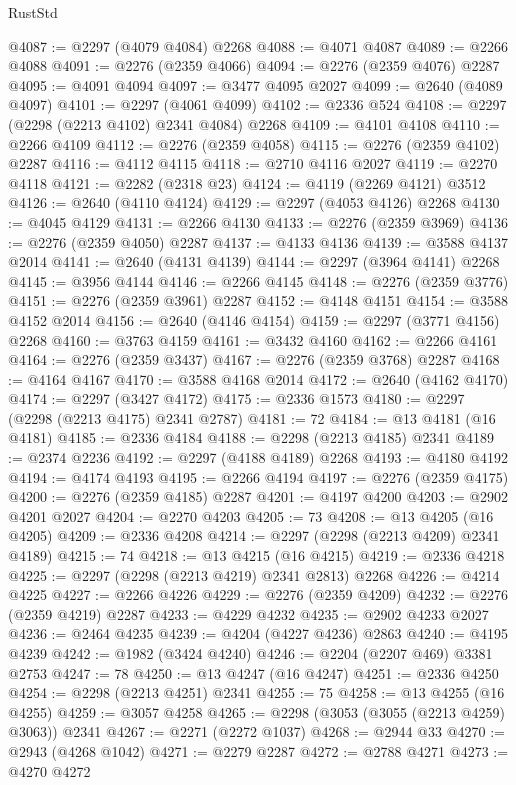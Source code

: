 \begin{lexlean}{RustStd}
\begin{coremodule}
@4087 := @2297 (@4079 @4084) @2268
@4088 := @4071 @4087
@4089 := @2266 @4088
@4091 := @2276 (@2359 @4066)
@4094 := @2276 (@2359 @4076) @2287
@4095 := @4091 @4094
@4097 := @3477 @4095 @2027
@4099 := @2640 (@4089 @4097)
@4101 := @2297 (@4061 @4099)
@4102 := @2336 @524
@4108 := @2297 (@2298 (@2213 @4102) @2341 @4084) @2268
@4109 := @4101 @4108
@4110 := @2266 @4109
@4112 := @2276 (@2359 @4058)
@4115 := @2276 (@2359 @4102) @2287
@4116 := @4112 @4115
@4118 := @2710 @4116 @2027
@4119 := @2270 @4118
@4121 := @2282 (@2318 @23)
@4124 := @4119 (@2269 @4121) @3512
@4126 := @2640 (@4110 @4124)
@4129 := @2297 (@4053 @4126) @2268
@4130 := @4045 @4129
@4131 := @2266 @4130
@4133 := @2276 (@2359 @3969)
@4136 := @2276 (@2359 @4050) @2287
@4137 := @4133 @4136
@4139 := @3588 @4137 @2014
@4141 := @2640 (@4131 @4139)
@4144 := @2297 (@3964 @4141) @2268
@4145 := @3956 @4144
@4146 := @2266 @4145
@4148 := @2276 (@2359 @3776)
@4151 := @2276 (@2359 @3961) @2287
@4152 := @4148 @4151
@4154 := @3588 @4152 @2014
@4156 := @2640 (@4146 @4154)
@4159 := @2297 (@3771 @4156) @2268
@4160 := @3763 @4159
@4161 := @3432 @4160
@4162 := @2266 @4161
@4164 := @2276 (@2359 @3437)
@4167 := @2276 (@2359 @3768) @2287
@4168 := @4164 @4167
@4170 := @3588 @4168 @2014
@4172 := @2640 (@4162 @4170)
@4174 := @2297 (@3427 @4172)
@4175 := @2336 @1573
@4180 := @2297 (@2298 (@2213 @4175) @2341 @2787)
@4181 := 72
@4184 := @13 @4181 (@16 @4181)
@4185 := @2336 @4184
@4188 := @2298 (@2213 @4185) @2341
@4189 := @2374 @2236
@4192 := @2297 (@4188 @4189) @2268
@4193 := @4180 @4192
@4194 := @4174 @4193
@4195 := @2266 @4194
@4197 := @2276 (@2359 @4175)
@4200 := @2276 (@2359 @4185) @2287
@4201 := @4197 @4200
@4203 := @2902 @4201 @2027
@4204 := @2270 @4203
@4205 := 73
@4208 := @13 @4205 (@16 @4205)
@4209 := @2336 @4208
@4214 := @2297 (@2298 (@2213 @4209) @2341 @4189)
@4215 := 74
@4218 := @13 @4215 (@16 @4215)
@4219 := @2336 @4218
@4225 := @2297 (@2298 (@2213 @4219) @2341 @2813) @2268
@4226 := @4214 @4225
@4227 := @2266 @4226
@4229 := @2276 (@2359 @4209)
@4232 := @2276 (@2359 @4219) @2287
@4233 := @4229 @4232
@4235 := @2902 @4233 @2027
@4236 := @2464 @4235
@4239 := @4204 (@4227 @4236) @2863
@4240 := @4195 @4239
@4242 := @1982 (@3424 @4240)
@4246 := @2204 (@2207 @469) @3381 @2753
@4247 := 78
@4250 := @13 @4247 (@16 @4247)
@4251 := @2336 @4250
@4254 := @2298 (@2213 @4251) @2341
@4255 := 75
@4258 := @13 @4255 (@16 @4255)
@4259 := @3057 @4258
@4265 := @2298 (@3053 (@3055 (@2213 @4259) @3063)) @2341
@4267 := @2271 (@2272 @1037)
@4268 := @2944 @33
@4270 := @2943 (@4268 @1042)
@4271 := @2279 @2287
@4272 := @2788 @4271
@4273 := @4270 @4272

\end{coremodule}
\end{lexlean}
